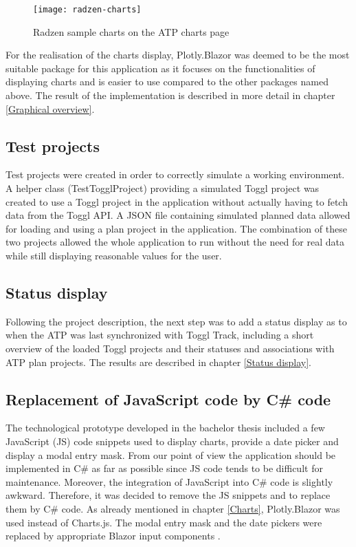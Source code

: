 \begin{figure}[H]
	\centering
	\texttt{[image: radzen-charts]}
	\caption{Radzen sample charts on the ATP charts page}
	\label{radzen}
\end{figure}

For the realisation of the charts display, Plotly.Blazor was deemed to be the most suitable package for this application as it focuses on the functionalities of displaying charts and is easier to use compared to the other packages named above. The result of the implementation is described in more detail in chapter \ref{Graphical overview}.

\subsection{Test projects}
Test projects were created in order to correctly simulate a working environment. A helper class (TestTogglProject) providing a simulated Toggl project was created to use a Toggl project in the application without actually having to fetch data from the Toggl API. A JSON file containing simulated planned data allowed for loading and using a plan project in the application. The combination of these two projects allowed the whole application to run without the need for real data while still displaying reasonable values for the user.

\subsection{Status display}
Following the project description, the next step was to add a status display as to when the ATP was last synchronized with Toggl Track, including a short overview of the loaded Toggl projects and their statuses and associations with ATP plan projects. The results are described in chapter \ref{Status display}.

\subsection{Replacement of JavaScript code by C\# code} \label{JS replacement}
The technological prototype developed in the bachelor thesis included a few JavaScript (JS) code snippets used to display charts, provide a date picker and display a modal entry mask. From our point of view the application should be implemented in C\# as far as possible since JS code tends to be difficult for maintenance. Moreover, the integration of JavaScript into C\# code is slightly awkward. Therefore, it was decided to remove the JS snippets and to replace them by C\# code. As already mentioned in chapter \ref{Charts}, Plotly.Blazor was used instead of Charts.js. The modal entry mask and the date pickers were replaced by appropriate Blazor input components \cite{blazor-input-url}.

